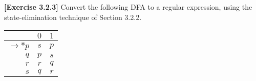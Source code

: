 \textbf{[Exercise 3.2.3]} Convert the following DFA to a regular expression, using the 
state-elimination technique of Section 3.2.2.
\begin{center}
    \begin{tabular}{r||c|c}
                            & $0$          & $1$   \\ \hline \hline
        $\rightarrow *p$    & $s$          & $p$   \\
        $q$                 & $p$          & $s$   \\
        $r$                 & $r$          & $q$   \\
        $s$                 & $q$          & $r$ 
        
    \end{tabular}
\end{center}